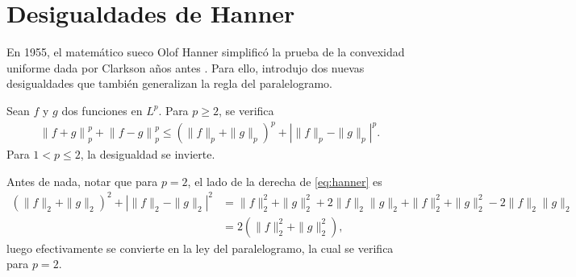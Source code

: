\section{Desigualdades de Hanner}
En 1955, el matemático sueco Olof Hanner simplificó la prueba de la convexidad uniforme dada por Clarkson años antes \cite{hanner}. Para ello, introdujo dos nuevas desigualdades que también generalizan la regla del paralelogramo.

\begin{theorem}
    Sean $ f $ y $ g $ dos funciones en $L^p$. Para $ p \geq 2 $, se verifica
    \begin{align} \label{eq:hanner}
        \left\| f+g \right\|_p^p + \left\| f-g \right\|_p^p \leq \left( \|f \|_p + \|g\|_p \right)^p + \left| \|f \|_p - \|g\|_p \right|^p.
    \end{align}
    Para $ 1 < p \leq 2 $, la desigualdad se invierte.
\end{theorem}

Antes de nada, notar que para $ p = 2 $, el lado de la derecha de \eqref{eq:hanner} es
\begin{align}
    \left( \|f \|_2 + \|g\|_2 \right)^2 + \left| \|f \|_2 - \|g\|_2 \right|^2 &= \|f \|_2^2 + \|g\|_2^2 + 2 \|f \|_2 \|g\|_2 + \|f \|_2^2 + \|g\|_2^2 - 2 \|f \|_2 \|g\|_2 \\
    &= 2 \left(\|f \|_2^2 + \|g\|_2^2\right),
\end{align}
luego efectivamente se convierte en la ley del paralelogramo, la cual se verifica para $ p = 2 $.

